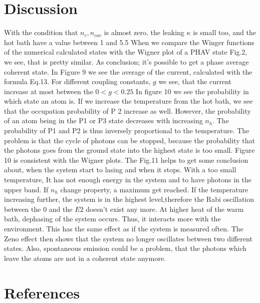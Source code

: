 \documentclass[12pt,a4paper]{article}
\begin{document}
\section{Discussion}
With the condition that $n_c, n_{cav}$ is almost zero, the leaking $\kappa$ is small too, and the hot bath have a value between 1 and 5.5 When we compare the Winger functions of the numerical calculated states with the Wigner plot of a PHAV state Fig.2, we see, that is pretty similar. As conclusion; it's possible to get a phase average coherent state. 
In Figure 9 we see the average of the current, calculated with the formula Eq.13.  For different coupling constants, $g$
we see, that the current increase at most between the $ 0<g<0.25$ 
In figure 10 we see the probability in which state an atom is. If we increase the temperature from the hot bath, we see that the occupation probability of P 2 increase as well. However, the probability of an atom being in the P1 or P3 state decreases with increasing $n_h$. The probability of P1 and P2 is thus inversely proportional to the temperature.
The problem is that the cycle of photons can be stopped, because the probability that the photons goes from the ground state into the highest state is too small.
Figure 10 is consistent with the Wigner plots.
The Fig.11 helps to get some conclusion about, when the system start to lasing and when it stops. With a too small temperature, It has not enough energy in the system and to have photons in the upper band. If $n_h$ change property, a maximum get reached. If the temperature increasing further, the system is in the highest level,therefore the Rabi oscillation between the 0 and the $E2$ doesn't exist any more.
At higher heat of the warm bath, dephasing of the system occurs. Thus, it interacts more with the environment. This has the same effect as if the system is measured often. The Zeno effect then shows that the system no longer oscillates between two different states. Also, spontaneous  emission could be a problem, that the photons which leave the atoms are not in a coherent state anymore. \cite{Niedenzu2019}
\cite{Scovil1959}
\section{References}
\printbibliography[title={Whole bibliography}]



\newpage
\end{document}
